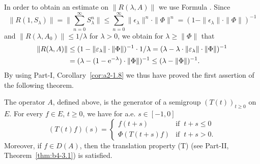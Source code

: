 In order to obtain an estimate on $\|R(\lambda,A)\|$ we use Formula .
Since 
\[ 
\|R(1,S_{\lambda})\| = \|\sum_{n=0}^{\infty} S_{\lambda}^n\| \leq \sum_{n=0}^{\infty} \|\epsilon_{\lambda}\|^n \cdot \|\Phi\|^n = (1-\|\epsilon_{\lambda}\| \cdot \|\Phi\|)^{-1}
\]
and $\|R(\lambda,A_0)\| \leq 1/\lambda$ for $\lambda > 0$, we obtain for $\lambda \geq \|\Phi\|$ that
\begin{align*}
\|R(\lambda,A)\| &\leq (1 - \|\epsilon_{\lambda}\| \cdot \|\Phi\|)^{-1} \cdot 1/\lambda = (\lambda - \lambda \cdot \|\epsilon_{\lambda}\| \cdot \|\Phi\|)^{-1} \\
&= (\lambda - (1 - \eu^{-\lambda}) \cdot \|\Phi\|)^{-1} \leq (\lambda - \|\Phi\|)^{-1}.
\end{align*}
By using Part-I, Corollary~\ref{cor:a2-1.8} we thus have proved the first assertion of the following theorem.
\begin{theorem}\label{thm:c4-3.1}
%
%
The operator $A$, defined above, is the generator of a semigroup $(T(t))_{t \geq 0}$ on $E$.
For every $f \in E$, $t \geq 0$, we have for a.e. $s \in [-1,0]$
\begin{equation}\label{eq:c4-3.3}
(T(t)f)(s) = \begin{cases}
    f(t+s) & \text{if } \ t+s \leq 0 \\
    \Phi(T(t+s)f) & \text{if } \ t+s > 0.
\end{cases}
\end{equation}
Moreover, if\/ $f \in D(A)$, then the translation property (T) (see Part-II, Theorem~\ref{thm:b4-3.1}) is satisfied.
\end{theorem}
